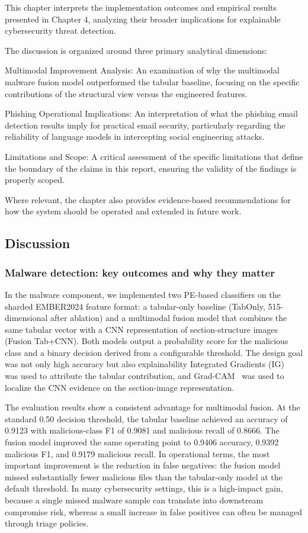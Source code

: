 \documentclass[conference]{IEEEtran}
\begin{document}
This chapter interprets the implementation outcomes and empirical results presented in Chapter 4, analyzing their broader implications for explainable cybersecurity threat detection.

The discussion is organized around three primary analytical dimensions:

Multimodal Improvement Analysis: An examination of why the multimodal malware fusion model outperformed the tabular baseline, focusing on the specific contributions of the structural view versus the engineered features.

Phishing Operational Implications: An interpretation of what the phishing email detection results imply for practical email security, particularly regarding the reliability of language models in intercepting social engineering attacks.

Limitations and Scope: A critical assessment of the specific limitations that define the boundary of the claims in this report, ensuring the validity of the findings is properly scoped.

Where relevant, the chapter also provides evidence-based recommendations for how the system should be operated and extended in future work.

\subsection{Discussion}

\subsubsection{Malware detection: key outcomes and why they matter}

In the malware component, we implemented two PE-based classifiers on the sharded EMBER2024 feature format: a tabular-only baseline (TabOnly, 515-dimensional after ablation) and a multimodal fusion model that combines the same tabular vector with a CNN representation of section-structure images (Fusion Tab+CNN). Both models output a probability score for the malicious class and a binary decision derived from a configurable threshold. The design goal was not only high accuracy but also explainability Integrated Gradients (IG)~\cite{MAQ2017} was used to attribute the tabular contribution, and Grad-CAM~\cite{SCDVPB2017} was used to localize the CNN evidence on the section-image representation.

The evaluation results show a consistent advantage for multimodal fusion. At the standard 0.50 decision threshold, the tabular baseline achieved an accuracy of 0.9123 with malicious-class F1 of 0.9081 and malicious recall of 0.8666. The fusion model improved the same operating point to 0.9406 accuracy, 0.9392 malicious F1, and 0.9179 malicious recall. In operational terms, the most important improvement is the reduction in false negatives: the fusion model missed substantially fewer malicious files than the tabular-only model at the default threshold. In many cybersecurity settings, this is a high-impact gain, because a single missed malware sample can translate into downstream compromise risk, whereas a small increase in false positives can often be managed through triage policies.
\end{document}
